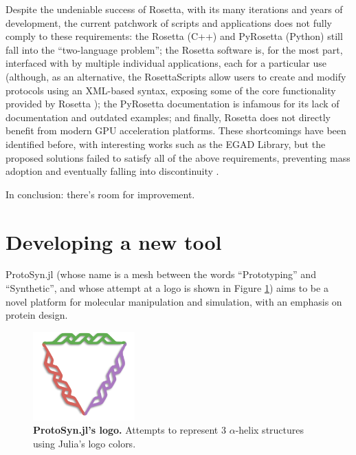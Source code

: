 \documentclass{juliacon}
\begin{document}
Despite the undeniable success of Rosetta, with its many iterations and years of development, the current patchwork of scripts and applications does not fully comply to these requirements: the Rosetta (C++) and PyRosetta (Python) still fall into the “two-language problem”; the Rosetta software is, for the most part, interfaced with by multiple individual applications, each for a particular use (although, as an alternative, the RosettaScripts allow users to create and modify protocols using an XML-based syntax, exposing some of the core functionality provided by Rosetta \cite{Fleishman2011}); the PyRosetta documentation is infamous for its lack of documentation and outdated examples; and finally, Rosetta does not directly benefit from modern GPU acceleration platforms. These shortcomings have been identified before, with interesting works such as the EGAD Library, but the proposed solutions failed to satisfy all of the above requirements, preventing mass adoption and eventually falling into discontinuity \cite{Chowdry2007}.\vspace{5mm}

In conclusion: there’s room for improvement.

\section{Developing a new tool}

ProtoSyn.jl (whose name is a mesh between the words “Prototyping” and “Synthetic”, and whose attempt at a logo is shown in Figure \ref{fig:ProtoSynArticle-IM1}) aims to be a novel platform for molecular manipulation and simulation, with an emphasis on protein design.

\begin{figure}[h]
\centering
\includegraphics[width=0.35\textwidth]{ProtoSynArticle-IM1}
\caption{\textbf{ProtoSyn.jl's logo.} Attempts to represent 3 $\alpha$-helix structures using Julia's logo colors.}
\label{fig:ProtoSynArticle-IM1}
\end{figure}
\end{document}
